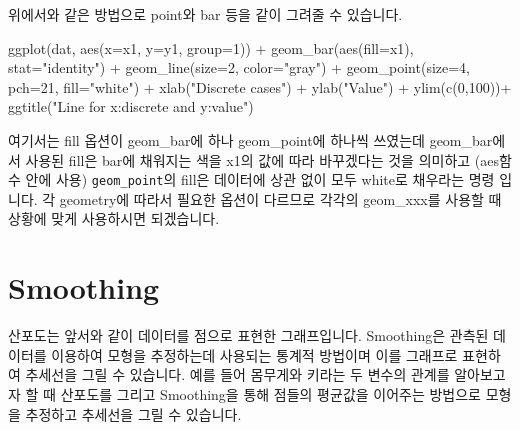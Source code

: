 \documentclass[
]{book}
\newenvironment{Shaded}{\begin{snugshade}}{\end{snugshade}}
\newcommand{\AttributeTok}[1]{\textcolor[rgb]{0.77,0.63,0.00}{#1}}
\newcommand{\DecValTok}[1]{\textcolor[rgb]{0.00,0.00,0.81}{#1}}
\newcommand{\FunctionTok}[1]{\textcolor[rgb]{0.00,0.00,0.00}{#1}}
\newcommand{\NormalTok}[1]{#1}
\newcommand{\SpecialCharTok}[1]{\textcolor[rgb]{0.00,0.00,0.00}{#1}}
\newcommand{\StringTok}[1]{\textcolor[rgb]{0.31,0.60,0.02}{#1}}
\begin{document}
위에서와 같은 방법으로 point와 bar 등을 같이 그려줄 수 있습니다.

\begin{Shaded}
\begin{Highlighting}[]
\FunctionTok{ggplot}\NormalTok{(dat, }\FunctionTok{aes}\NormalTok{(}\AttributeTok{x=}\NormalTok{x1, }\AttributeTok{y=}\NormalTok{y1, }\AttributeTok{group=}\DecValTok{1}\NormalTok{)) }\SpecialCharTok{+}
  \FunctionTok{geom\_bar}\NormalTok{(}\FunctionTok{aes}\NormalTok{(}\AttributeTok{fill=}\NormalTok{x1), }\AttributeTok{stat=}\StringTok{"identity"}\NormalTok{) }\SpecialCharTok{+}
  \FunctionTok{geom\_line}\NormalTok{(}\AttributeTok{size=}\DecValTok{2}\NormalTok{, }\AttributeTok{color=}\StringTok{"gray"}\NormalTok{) }\SpecialCharTok{+}
  \FunctionTok{geom\_point}\NormalTok{(}\AttributeTok{size=}\DecValTok{4}\NormalTok{, }\AttributeTok{pch=}\DecValTok{21}\NormalTok{, }\AttributeTok{fill=}\StringTok{"white"}\NormalTok{) }\SpecialCharTok{+}
  \FunctionTok{xlab}\NormalTok{(}\StringTok{"Discrete cases"}\NormalTok{) }\SpecialCharTok{+} \FunctionTok{ylab}\NormalTok{(}\StringTok{"Value"}\NormalTok{) }\SpecialCharTok{+}
  \FunctionTok{ylim}\NormalTok{(}\FunctionTok{c}\NormalTok{(}\DecValTok{0}\NormalTok{,}\DecValTok{100}\NormalTok{))}\SpecialCharTok{+}
  \FunctionTok{ggtitle}\NormalTok{(}\StringTok{"Line for x:discrete and y:value"}\NormalTok{)}
\end{Highlighting}
\end{Shaded}

여기서는 fill 옵션이 geom\_bar에 하나 geom\_point에 하나씩 쓰였는데 geom\_bar에서 사용된 fill은 bar에 채워지는 색을 x1의 값에 따라 바꾸겠다는 것을 의미하고 (aes함수 안에 사용) \texttt{geom\_point}의 fill은 데이터에 상관 없이 모두 white로 채우라는 명령 입니다. 각 geometry에 따라서 필요한 옵션이 다르므로 각각의 geom\_xxx를 사용할 때 상황에 맞게 사용하시면 되겠습니다.

\hypertarget{smoothing}{%
\section{Smoothing}\label{smoothing}}

산포도는 앞서와 같이 데이터를 점으로 표현한 그래프입니다. Smoothing은 관측된 데이터를 이용하여 모형을 추정하는데 사용되는 통계적 방법이며 이를 그래프로 표현하여 추세선을 그릴 수 있습니다. 예를 들어 몸무게와 키라는 두 변수의 관계를 알아보고자 할 때 산포도를 그리고 Smoothing을 통해 점들의 평균값을 이어주는 방법으로 모형을 추정하고 추세선을 그릴 수 있습니다.
\end{document}
